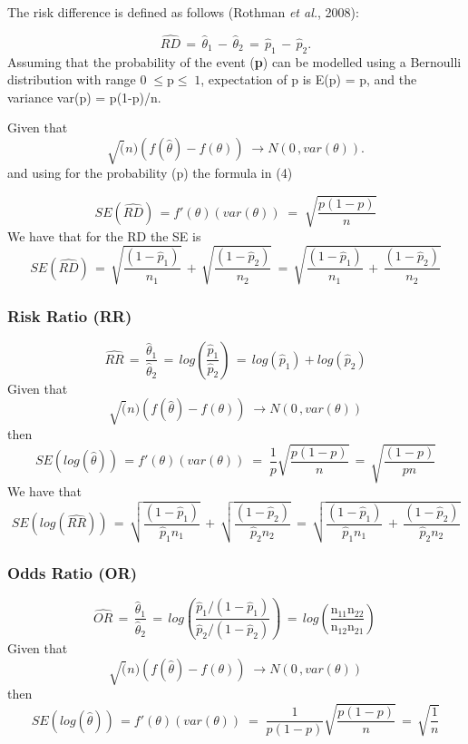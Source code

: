 \documentclass[]{article}
\begin{document}
The risk difference is defined as follows (Rothman \emph{et al.}, 2008):

\[\widehat{RD} \,=\, \hat \theta_{1}\,-\,\hat \theta_{2} \,=\, \hat p_{1}\,-\,\hat p_{2}.\]
Assuming that the probability of the event (\textbf{p}) can be modelled
using a Bernoulli distribution with range \(0\;\leq \text{p} \leq\;1\),
expectation of p is E(p) = p, and the variance var(p) = p(1-p)/n.~

Given that
\[\sqrt(n)\left(f(\hat\theta)-f(\theta)\right)\; \rightarrow N(0\,, var(\theta)).\]
and using for the probability (p) the formula in (4)

\[SE(\widehat{RD})\,=f'(\theta)(var(\theta))\;=\; \sqrt{\frac{p(1-p)}{n}}\]
We have that for the RD the SE is\\
\[SE(\widehat{RD})\,=\, \sqrt{\frac{(1-\hat p_{1})}{n_{1}}}\,+\,\sqrt{\frac{(1-\hat p_{2})}{n_{2}}}\,=\,\sqrt{\frac{(1-\hat p_{1})}{n_{1}}\,+\,\frac{(1-\hat p_{2})}{n_{2}}}\]

\hypertarget{risk-ratio-rr}{%
\subsubsection{Risk Ratio (RR)}\label{risk-ratio-rr}}

\[\widehat{RR} \,=\, \frac{\hat \theta_{1}}{\hat \theta_{2}} \,=\, log\left(\frac{\hat p_{1}}{\hat p_{2}}\right)\,=\,log(\hat p_{1}) + log(\hat p_{2})\]
Given that
\[\sqrt(n)\left(f(\hat\theta)-f(\theta)\right)\; \rightarrow N(0\,, var(\theta))\]
then
\[SE(log(\hat{\theta}))\,=f'(\theta)(var(\theta))\;=\;\frac{1}{p}\sqrt{\frac{p(1-p)}{n}}\,=\,\sqrt{\frac{(1-p)}{pn}}\]
We have that
\[SE(log(\widehat{RR}))\,=\, \sqrt{\frac{(1-\hat p_{1})}{\hat p_{1}n_{1}}}\,+\,\sqrt{\frac{(1-\hat p_{2})}{\hat p_{2}n_{2}}}\,=\,\sqrt{\frac{(1-\hat p_{1})}{\hat p_{1}n_{1}}\,+\,\frac{(1-\hat p_{2})}{\hat p_{2}n_{2}}}\]

\hypertarget{odds-ratio-or}{%
\subsubsection{Odds Ratio (OR)}\label{odds-ratio-or}}

\[\widehat{OR} \,=\, \frac{\hat \theta_{1}}{\hat \theta_{2}} \,=\, log\left(\frac{\hat p_{1}/(1-\hat p_{1})}{\hat p_{2}/(1-\hat p_{2})}\right)\,=\,log\left(\frac{\text{n}_{11}\text{n}_{22}}{\text{n}_{12}\text{n}_{21}}\right)\,\]
Given that
\[\sqrt(n)\left(f(\hat\theta)-f(\theta)\right)\; \rightarrow N(0\,, var(\theta))\]
then
\[SE(log(\hat{\theta}))\,=f'(\theta)(var(\theta))\;=\;\frac{1}{p(1-p)}\sqrt{\frac{p(1-p)}{n}}\,=\,\sqrt{\frac{1}{n}}\]
\end{document}
